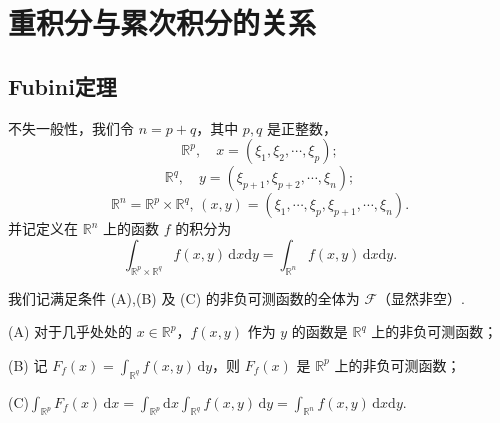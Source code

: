 \documentclass[../../main.tex]{subfiles}%
\begin{document}
\section{重积分与累次积分的关系}

\subsection{Fubini定理}

\begin{definition}
不失一般性，我们令 \( n = p + q \)，其中 \( p, q \) 是正整数，
\[
\mathbb{R}^p, \quad x = (\xi_1, \xi_2, \cdots, \xi_p);
\]
\[
\mathbb{R}^q, \quad y = (\xi_{p + 1}, \xi_{p + 2}, \cdots, \xi_n);
\]
\[
\mathbb{R}^n = \mathbb{R}^p \times \mathbb{R}^q, \, (x, y) = (\xi_1, \cdots, \xi_p, \xi_{p + 1}, \cdots, \xi_n).
\]
并记定义在 \( \mathbb{R}^n \) 上的函数 \( f \) 的积分为
\[
\int_{\mathbb{R}^p \times \mathbb{R}^q} f(x, y) \, \mathrm{d}x\mathrm{d}y = \int_{\mathbb{R}^n} f(x, y) \, \mathrm{d}x\mathrm{d}y.
\]
\end{definition}

\begin{definition}
我们记满足条件 (A),(B) 及 (C) 的非负可测函数的全体为 \( \mathcal{F} \)（显然非空）.

(A) 对于几乎处处的 \( x \in \mathbb{R}^p \)，\( f(x, y) \) 作为 \( y \) 的函数是 \( \mathbb{R}^q \) 上的非负可测函数；

(B) 记 \( F_f(x) = \int_{\mathbb{R}^q} f(x, y) \, \mathrm{d}y \)，则 \( F_f(x) \) 是 \( \mathbb{R}^p \) 上的非负可测函数；

(C)$\int_{\mathbb{R}^p} F_f(x) \, \mathrm{d}x = \int_{\mathbb{R}^p} \mathrm{d}x \int_{\mathbb{R}^q} f(x, y) \, \mathrm{d}y = \int_{\mathbb{R}^n} f(x, y) \, \mathrm{d}x\mathrm{d}y.$
\end{definition}
\end{document}
